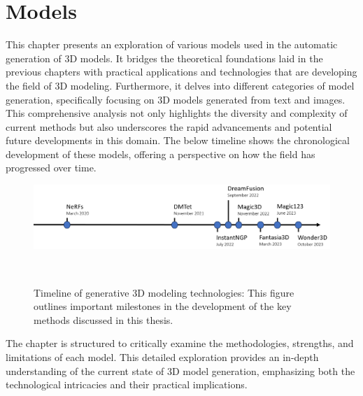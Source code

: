\chapter{Models}\label{ch:models}

This chapter presents an exploration of various models used in the automatic generation of 3D models. It bridges the theoretical foundations laid in the previous chapters with practical applications and technologies that are developing the field of 3D modeling. Furthermore, it delves into different categories of model generation, specifically focusing on 3D models generated from text and images. This comprehensive analysis not only highlights the diversity and complexity of current methods but also underscores the rapid advancements and potential future developments in this domain. The below timeline shows the chronological development of these models, offering a perspective on how the field has progressed over time.

\begin{figure}[H]
    \centering
      \includegraphics[width=\textwidth]{figures/timelineMethods.png}
      \caption{Timeline of generative 3D modeling technologies: This figure outlines important milestones in the development of the key methods discussed in this thesis.}~\label{fig:timelineMethods}
\end{figure}

The chapter is structured to critically examine the methodologies, strengths, and limitations of each model. This detailed exploration provides an in-depth understanding of the current state of 3D model generation, emphasizing both the technological intricacies and their practical implications.



